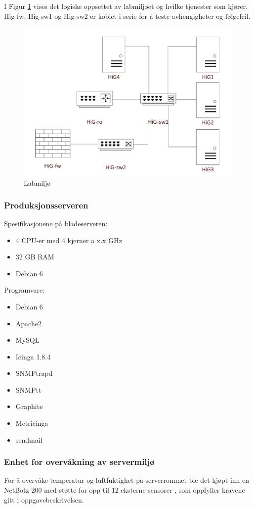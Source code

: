 I Figur \ref{laboppsett} vises det logiske oppsettet av labmiljøet og hvilke tjenester som kjører. Hig-fw, Hig-sw1 og Hig-sw2 er koblet i serie for å teste avhengigheter og følgefeil.

\begin{figure}[H]
    \centering
    \includegraphics[scale=0.4]{img/labmiljo}
    \caption{Labmiljø}
    \label{laboppsett}
\end{figure}


\subsubsection{Produksjonsserveren}
Spesifikasjonene på bladeserveren:
\begin{itemize}
\item 4 CPU-er med 4 kjerner a x.x GHz
\item 32 GB RAM
\item Debian 6
\end{itemize}
Programvare:
\begin{itemize}
\item Debian 6
\item Apache2
\item MySQL
\item Icinga 1.8.4
\item SNMPtrapd
\item SNMPtt
\item Graphite
\item Metricinga 
\item sendmail
\end{itemize}
\subsubsection{Enhet for overvåkning av servermiljø}
For å overvåke temperatur og luftfuktighet på serverrommet ble det kjøpt inn en NetBotz 200 med støtte for opp til 12 eksterne sensorer \cite{netbotz}, som oppfyller kravene gitt i oppgavebeskrivelsen. 

